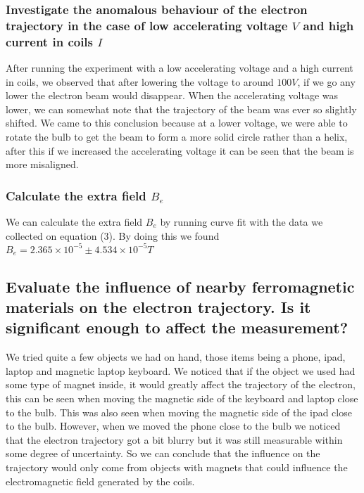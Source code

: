 \documentclass{article}
\begin{document}
\subsubsection*{Investigate the anomalous behaviour of the electron trajectory
in the case of low accelerating voltage $V$ and high current in coils $I$}
After running the experiment with a low accelerating voltage and a high current
in coils, we observed that after lowering the voltage to around $100V$, if we go
any lower the electron beam would disappear. When the accelerating voltage was
lower, we can somewhat note that the trajectory of the beam was ever so slightly
shifted. We came to this conclusion because at a lower voltage, we were able to
rotate the bulb to get the beam to form a more solid circle rather than a helix,
after this if we increased the accelerating voltage it can be seen that the
beam is more misaligned.
\subsubsection*{Calculate the extra field $B_e$}
We can calculate the extra field $B_e$ by running curve fit with the data we
collected on equation (3). By doing this we found $B_e = 2.365\times10^{-5}\pm
4.534\times10^{-5}T$

\subsection*{Evaluate the influence of nearby ferromagnetic materials on the
electron trajectory. Is it significant enough to affect the measurement?}
We tried quite a few objects we had on hand, those items being a phone, ipad,
laptop and magnetic laptop keyboard. We noticed that if the object we used had
some type of magnet inside, it would greatly affect the trajectory of the electron,
this can be seen when moving the magnetic side of the keyboard and laptop close
to the bulb. This was also seen when moving the magnetic side of the ipad close
to the bulb. However, when we moved the phone close to the bulb we noticed that
the electron trajectory got a bit blurry but it was still measurable within some
degree of uncertainty. So we can conclude that the influence on the trajectory
would only come from objects with magnets that could influence the electromagnetic
field generated by the coils.

\newpage
\end{document}
